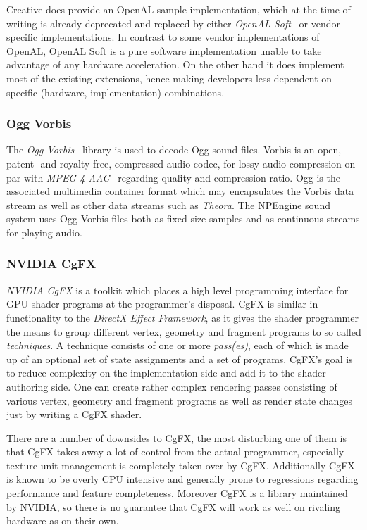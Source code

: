 Creative does provide an OpenAL sample implementation, which at the time of
writing is already deprecated and replaced by either \textit{OpenAL
Soft}~\cite{misc:openal-soft} or vendor specific implementations. In contrast to
some vendor implementations of OpenAL, OpenAL Soft is a pure software
implementation unable to take advantage of any hardware acceleration. On the
other hand it does implement most of the existing extensions, hence making
developers less dependent on specific (hardware, implementation) combinations.

\subsubsection{Ogg Vorbis}

The \textit{Ogg Vorbis}~\cite{misc:ogg-vorbis} library is used to decode Ogg
sound files. Vorbis is an open, patent- and royalty-free, compressed audio
codec, for lossy audio compression on par with \textit{MPEG-4
AAC}\cite{misc:mpeg-aac}~\cite{misc:mpeg-aac-standard} regarding quality and
compression ratio. Ogg is the associated multimedia container format which may
encapsulates the Vorbis data stream as well as other data streams such as
\textit{Theora}\cite{misc:ogg-theora}. The NPEngine sound system uses Ogg Vorbis
files both as fixed-size samples and as continuous streams for playing audio.

\subsubsection{NVIDIA CgFX}

\textit{NVIDIA CgFX}\cite{misc:nvcg} is a toolkit which places a high
level programming interface for GPU shader programs at the programmer's
disposal. CgFX is similar in functionality to the \textit{DirectX Effect
Framework}\cite{misc:directx}\cite{book:effect-hlsl}, as it gives the
shader programmer the means to group different vertex, geometry and fragment
programs to so called \textit{techniques}. A technique consists of one or more
\textit{pass(es)}, each of which is made up of an optional set of state
assignments and a set of programs. CgFX's goal is to reduce complexity on the
implementation side and add it to the shader authoring side. One can create
rather complex rendering passes consisting of various vertex, geometry and
fragment programs as well as render state changes just by writing a CgFX shader.

There are a number of downsides to CgFX, the most disturbing one of them is that
CgFX takes away a lot of control from the actual programmer, especially texture
unit management is completely taken over by CgFX. Additionally CgFX is known to
be overly CPU intensive and generally prone to regressions regarding performance
and feature completeness. Moreover CgFX is a library maintained by NVIDIA,
so there is no guarantee that CgFX will work as well on rivaling hardware as on
their own.

